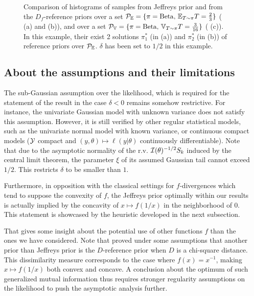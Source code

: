 \begin{figure}
{    }
    \caption{Comparison of histograms of samples from Jeffreys prior and from the $D_f$-reference priors over a set $\mathcal{P}_{\mathbb{E}}=\{\pi=\mathrm{Beta},\,\mathbb{E}_{T\sim\pi}T=\frac{2}{3}\}$ ( (a) and (b)), and over a set $\mathcal{P}_{\mathbb{V}}=\{\pi=\mathrm{Beta},\,\mathbb{V}_{T\sim\pi}T=\frac{3}{16}\}$ ( (c)). In this example, their exist 2 solutions $\pi_1^\ast$ (in  (a)) and $\pi_2^\ast$ (in  (b)) of reference priors over $\mathcal{P}_{\mathbb{E}}$. $\delta$ has been set to $1/2$ in this example.}
    \label{fig:exbeta}
\end{figure}





    \subsection{About the assumptions and their limitations}

    The sub-Gaussian assumption over the likelihood, which is required for the statement of the result in the case $\delta<0$
    remains somehow restrictive. For instance,
    the univariate Gaussian model with unknown variance does not satisfy this assumption. 
    However, 
    it is still verified by other regular statistical models, such as the
     univariate normal model with known variance, or continuous compact models ($\mathcal{Y}$ compact and $(y,\theta)\mapsto\ell(y|\theta)$ continuously differentiable). {Note that due to the asymptotic normality of the r.v. $\mathcal{I}(\theta)^{-1/2}S_k$ induced by the central limit theorem, the parameter $\xi$ of its assumed Gaussian tail cannot exceed $1/2$. This restricts $\delta$ to be smaller than $1$.}

Furthermore, %
in opposition with the classical settings for $f$-divergences which tend to suppose the convexity of $f$, the Jeffreys prior optimally within our results is actually implied by the concavity of $x\mapsto f(1/x)$ in the neighborhood of $0$.
This statement is showcased by the heuristic developed in the next subsection.

That gives some insight about the potential use of other functions $f$ than the ones we have considered.
Note that \citet{clarke_reference_1997} proved under some assumptions that another prior than Jeffreys prior is the $D$-reference prior when $D$ is a chi-square distance. This dissimilarity measure corresponds to the case where $f(x)=x^{-1}$, making $x\mapsto f(1/x)$ both convex and concave. 
A conclusion about the optimum of such generalized
mutual information thus requires stronger regularity assumptions on the likelihood to push
the asymptotic analysis further. %

